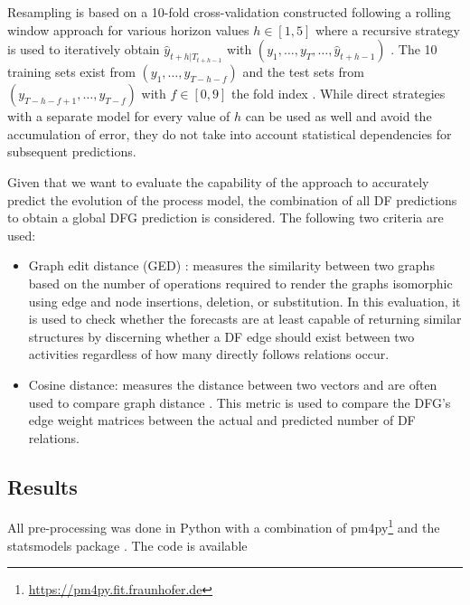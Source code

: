 Resampling is based on a 10-fold cross-validation constructed following a rolling window approach for various horizon values $h\in[1,5]$ where a recursive strategy is used to iteratively obtain $\hat{y}_{t+h|T_{t+h-1}}$ with $(y_1,\dots,y_{T},\dots,\hat{y}_{t+h-1})$ \cite{weigend2018time}.
The 10 training sets exist from $(y_1,\dots,y_{T-h-f})$ and the test sets from\\ $(y_{T-h-f+1},\dots,y_{T-f})$ with $f\in[0,9]$ the fold index \cite{bergmeir2012use}.
While direct strategies with a separate model for every value of $h$ can be used as well and avoid the accumulation of error, they do not take into account statistical dependencies for subsequent predictions.

Given that we want to evaluate the capability of the approach to accurately predict the evolution of the process model, the combination of all DF predictions to obtain a global DFG prediction is considered.
The following two criteria are used:
\begin{itemize}
	\item Graph edit distance (GED) \cite{gao2010survey}: measures the similarity between two graphs based on the number of operations required to render the graphs isomorphic using edge and node insertions, deletion, or substitution.
	In this evaluation, it is used to check whether the forecasts are at least capable of returning similar structures by discerning whether a DF edge should exist between two activities regardless of how many directly follows relations occur.
	\item Cosine distance: measures the distance between two vectors and are often used to compare graph distance . This metric is used to compare the DFG's edge weight matrices between the actual and predicted number of DF relations.
\end{itemize}

\subsection{Results}
All pre-processing was done in Python with a combination of pm4py\footnote{\url{https://pm4py.fit.fraunhofer.de}} and the statsmodels package \cite{seabold2010statsmodels}. 
The code is available %

